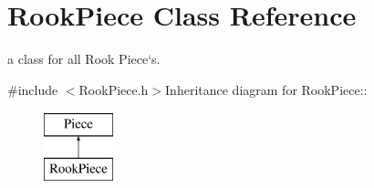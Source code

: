 \hypertarget{classRookPiece}{
\section{RookPiece Class Reference}
\label{classRookPiece}
}


a class for all Rook Piece`s.  


{\ttfamily \#include $<$RookPiece.h$>$}Inheritance diagram for RookPiece::\begin{figure}[H]
\begin{center}
\leavevmode
\includegraphics[height=2cm]{classRookPiece}
\end{center}
\end{figure}
